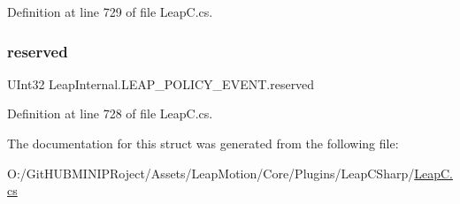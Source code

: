 Definition at line 729 of file Leap\+C.\+cs.

\mbox{\label{struct_leap_internal_1_1_l_e_a_p___p_o_l_i_c_y___e_v_e_n_t_a151a24f336684c7f15df18a7120bc803}} 
\subsubsection{\texorpdfstring{reserved}{reserved}}
{\footnotesize\ttfamily U\+Int32 Leap\+Internal.\+L\+E\+A\+P\+\_\+\+P\+O\+L\+I\+C\+Y\+\_\+\+E\+V\+E\+N\+T.\+reserved}



Definition at line 728 of file Leap\+C.\+cs.



The documentation for this struct was generated from the following file\+:\begin{DoxyCompactItemize}
\item 
O\+:/\+Git\+H\+U\+B\+M\+I\+N\+I\+P\+Roject/\+Assets/\+Leap\+Motion/\+Core/\+Plugins/\+Leap\+C\+Sharp/\mbox{\hyperlink{_leap_c_8cs}{Leap\+C.\+cs}}\end{DoxyCompactItemize}
